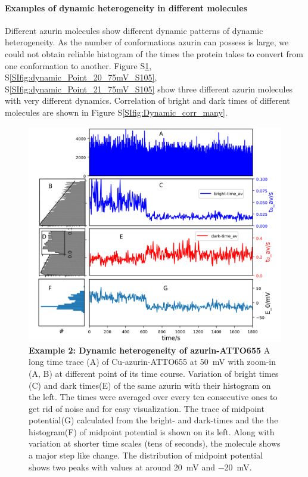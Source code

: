 \paragraph*{Examples of dynamic heterogeneity in different molecules}
Different azurin molecules show different dynamic patterns of dynamic heterogeneity.
As the number of conformations azurin can possess is large, we could not obtain reliable histogram of the times the protein takes to convert from one conformation to another.
Figure S\ref{SIfig:dynamic_trace_steps}, S\ref{SIfig:dynamic_Point_20_75mV_S105}, S\ref{SIfig:dynamic_Point_21_75mV_S105} show three different azurin molecules with very different dynamics.
Correlation of bright and dark times of  different molecules are shown in Figure S\ref{SIfig:Dynamic_corr_many}.

\begin{figure}[ht]
  \centering
  \includegraphics[width=\textwidth]{dynamic_trace_steps}
  \makeatletter
  \renewcommand{\fnum@figure}{\figurename~S\thefigure}
  \makeatother
  \caption{\textbf{Example 2: Dynamic heterogeneity of azurin-ATTO655}
  A long time trace (A) of Cu-azurin-ATTO655 at \SI{50}{\mV} with zoom-in (A, B) at different point of its time course.
  Variation of bright times (C) and dark times(E) of the same azurin with their histogram on the left.
  The times were averaged over every ten consecutive ones to get rid of noise and for easy visualization.
  The trace of midpoint potential(G) calculated from the bright- and dark-times and the the histogram(F) of midpoint potential is shown on its left.
  Along with variation at shorter time scales (tens of seconds), the molecule shows a major step like change.
  The distribution of midpoint potential shows two peaks with values at around \SI{20}{\mV} and \SI{-20}{\mV}.
  }
  \label{SIfig:dynamic_trace_steps}
\end{figure}

